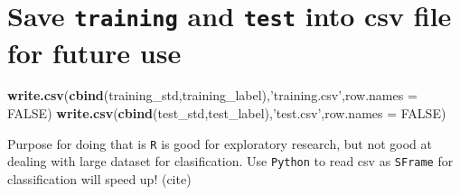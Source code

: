 \documentclass[]{article}
\newenvironment{Shaded}{\begin{snugshade}}{\end{snugshade}}
\newcommand{\KeywordTok}[1]{\textcolor[rgb]{0.13,0.29,0.53}{\textbf{{#1}}}}
\newcommand{\DataTypeTok}[1]{\textcolor[rgb]{0.13,0.29,0.53}{{#1}}}
\newcommand{\StringTok}[1]{\textcolor[rgb]{0.31,0.60,0.02}{{#1}}}
\newcommand{\OtherTok}[1]{\textcolor[rgb]{0.56,0.35,0.01}{{#1}}}
\newcommand{\NormalTok}[1]{{#1}}
\begin{document}
\section{Save \texttt{training} and \texttt{test} into csv file for
future use}\label{save-training-and-test-into-csv-file-for-future-use}

\begin{Shaded}
\begin{Highlighting}[]
\KeywordTok{write.csv}\NormalTok{(}\KeywordTok{cbind}\NormalTok{(training_std,training_label),}\StringTok{'training.csv'}\NormalTok{,}\DataTypeTok{row.names =} \OtherTok{FALSE}\NormalTok{)}
\KeywordTok{write.csv}\NormalTok{(}\KeywordTok{cbind}\NormalTok{(test_std,test_label),}\StringTok{'test.csv'}\NormalTok{,}\DataTypeTok{row.names =} \OtherTok{FALSE}\NormalTok{)}
\end{Highlighting}
\end{Shaded}

Purpose for doing that is \texttt{R} is good for exploratory research,
but not good at dealing with large dataset for clasification. Use
\texttt{Python} to read csv as \texttt{SFrame} for classification will
speed up! (cite)
\end{document}
